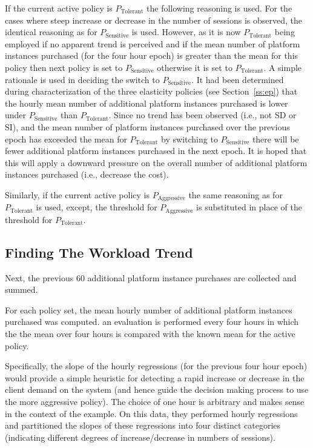   If the current active  policy is $P_\text{Tolerant}$ the following reasoning is used. For the cases where steep increase or decrease in the number of sessions is observed, the identical reasoning as for $P_\text{Sensitive}$ is used.  However, as it is now $P_\text{Tolerant}$ being employed if no apparent trend is perceived and if the mean number of platform instances purchased (for the four hour epoch) is greater than the mean for this  policy then next policy is set to $P_\text{Sensitive}$ otherwise it is set to $P_\text{Tolerant}$. 
	A simple rationale is used in deciding the switch to $P_\text{Sensitive}$. It had been determined during characterization of the three elasticity policies (see Section~\ref{ss:ep}) that the hourly mean number of additional platform instances purchased is lower under $P_\text{Sensitive}$ than $P_\text{Tolerant}$. Since no trend has been observed (i.e., not SD or SI), and the mean number of platform instances purchased over the previous epoch has exceeded the mean for $P_\text{Tolerant}$ by switching to $P_\text{Sensitive}$ there will be fewer additional platform instances purchased in the next epoch.  It is hoped that this will apply a downward pressure on the overall number of additional platform instances purchased (i.e., decrease the cost).
  
  Similarly, if the current active  policy is $P_\text{Aggressive}$ the same reasoning as for $P_\text{Tolerant}$ is used, except, the threshold for $P_\text{Aggressive}$ is substituted in place of the threshold for $P_\text{Tolerant}$.
 
  \subsection{Finding The Workload Trend}  
Next, the previous 60 additional platform instance purchases are collected and summed. 

  For each policy set, the mean hourly number of additional platform instances purchased was computed.  
 an evaluation is performed every four hours in which the the mean over four hours is compared with the known mean for the active policy. 

  Specifically, the slope of the hourly regressions (for the previous four hour epoch) would provide a simple heuristic for detecting a rapid increase or decrease in the client demand on the system (and hence guide the decision making process to use the more aggressive policy). The choice of one hour is arbitrary and makes sense in the context of the example. On this data, they performed hourly regressions and partitioned the slopes of these regressions into four distinct categories (indicating different degrees of increase/decrease in numbers of sessions).
 

